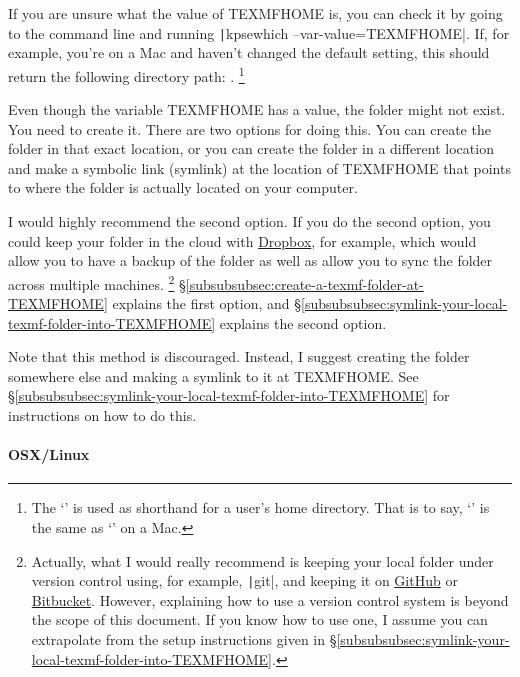 If you are unsure what the value of TEXMFHOME is, you can check it by going to the command line and running \texttt|kpsewhich --var-value=TEXMFHOME|.
If, for example, you're on a Mac and haven't changed the default setting, this should return the following directory path: .%
\footnote{%
The `\Directory{\textasciitilde}' is used as shorthand for a user's home directory.
That is to say, `' is the same as `' on a Mac.%
}

Even though the variable TEXMFHOME has a value, the folder might not exist.
You need to create it.
There are two options for doing this.
You can create the folder in that exact location, or you can create the folder in a different location and make a symbolic link (symlink) at the location of TEXMFHOME that points to where the folder is actually located on your computer.

I would highly recommend the second option.
If you do the second option, you could keep your  folder in the cloud with \href{https://dropbox.com/}{Dropbox}, for example, which would allow you to have a backup of the folder as well as allow you to sync the folder across multiple machines.%
\footnote{%
Actually, what I would really recommend is keeping your local  folder under version control using, for example, \texttt|git|, and keeping it on \href{https://github.com/}{GitHub} or \href{https://bitbucket.org/}{Bitbucket}.
However, explaining how to use a version control system is beyond the scope of this document.
If you know how to use one, I assume you can extrapolate from the setup instructions given in \S\ref{subsubsubsec:symlink-your-local-texmf-folder-into-TEXMFHOME}.%
}
\S\ref{subsubsubsec:create-a-texmf-folder-at-TEXMFHOME} explains the first option, and \S\ref{subsubsubsec:symlink-your-local-texmf-folder-into-TEXMFHOME} explains the second option.

\label{subsubsubsec:create-a-texmf-folder-at-TEXMFHOME}

Note that this method is discouraged.
Instead, I suggest creating the folder somewhere else and making a symlink to it at TEXMFHOME.
See \S\ref{subsubsubsec:symlink-your-local-texmf-folder-into-TEXMFHOME} for instructions on how to do this.

\paragraph{OSX/Linux}

